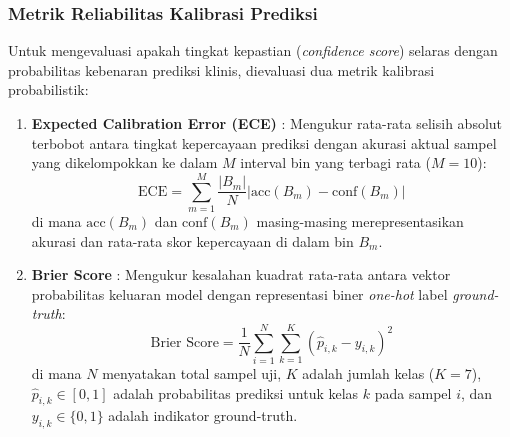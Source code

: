 \subsubsection{Metrik Reliabilitas Kalibrasi Prediksi}
Untuk mengevaluasi apakah tingkat kepastian (\textit{confidence score}) selaras dengan probabilitas kebenaran prediksi klinis, dievaluasi dua metrik kalibrasi probabilistik:
\begin{enumerate}[noitemsep]
	\item \textbf{Expected Calibration Error (ECE)} \cite{guo2017calibration}: Mengukur rata-rata selisih absolut terbobot antara tingkat kepercayaan prediksi dengan akurasi aktual sampel yang dikelompokkan ke dalam $M$ interval bin yang terbagi rata ($M=10$):
	\begin{equation}
		\text{ECE} = \sum_{m=1}^{M} \frac{|B_m|}{N} \left| \text{acc}(B_m) - \text{conf}(B_m) \right|
	\end{equation}
	di mana $\text{acc}(B_m)$ dan $\text{conf}(B_m)$ masing-masing merepresentasikan akurasi dan rata-rata skor kepercayaan di dalam bin $B_m$.

	\item \textbf{Brier Score} \cite{brier1950verification}: Mengukur kesalahan kuadrat rata-rata antara vektor probabilitas keluaran model dengan representasi biner \textit{one-hot} label \textit{ground-truth}:
	\begin{equation}
		\text{Brier Score} = \frac{1}{N} \sum_{i=1}^{N} \sum_{k=1}^{K} \left(\hat{p}_{i,k} - y_{i,k}\right)^2
	\end{equation}
	di mana $N$ menyatakan total sampel uji, $K$ adalah jumlah kelas ($K=7$), $\hat{p}_{i,k} \in [0, 1]$ adalah probabilitas prediksi untuk kelas $k$ pada sampel $i$, dan $y_{i,k} \in \{0, 1\}$ adalah indikator ground-truth.
\end{enumerate}

